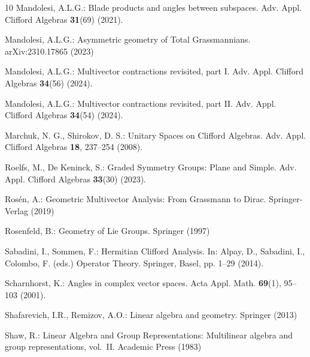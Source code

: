 \documentclass{birkjour}
\theoremstyle{definition}
\begin{document}
\begin{thebibliography}{10}
	Mandolesi, A.L.G.: Blade products and angles between subspaces.
	\newblock Adv. Appl. Clifford Algebras \textbf{31}(69) (2021).
	\newblock {}
	
	Mandolesi, A.L.G.: Asymmetric geometry of {T}otal {G}rassmannians.
	\newblock arXiv:2310.17865  (2023)
	
	Mandolesi, A.L.G.: Multivector contractions revisited, part {I}.
	\newblock Adv. Appl. Clifford Algebras \textbf{34}(56) (2024).
	\newblock {}
	
	Mandolesi, A.L.G.: Multivector contractions revisited, part {II}.
	\newblock Adv. Appl. Clifford Algebras \textbf{34}(54) (2024).
	\newblock {}
	
	Marchuk, N. G., Shirokov, D. S.: Unitary Spaces on {C}lifford Algebras.
	\newblock Adv. Appl. Clifford Algebras \textbf{18}, 237--254 (2008).
	\newblock {}
	
	Roelfs, M., De Keninck, S.: Graded Symmetry Groups: Plane and Simple.
	\newblock Adv. Appl. Clifford Algebras \textbf{33}(30) (2023).
	\newblock {}
	
	Ros{\'e}n, A.: Geometric Multivector Analysis: From Grassmann to Dirac.
	\newblock Springer-Verlag (2019)
	
	Rosenfeld, B.: Geometry of {L}ie Groups.
	\newblock Springer (1997)
	
	Sabadini, I., Sommen, F.: Hermitian Clifford Analysis.
	\newblock In: Alpay, D., Sabadini, I., Colombo, F. (eds.) Operator Theory. Springer, Basel, pp. 1--29 (2014).
	
	Scharnhorst, K.: Angles in complex vector spaces.
	\newblock Acta Appl. Math. \textbf{69}(1), 95--103 (2001).
	\newblock {}
	
	Shafarevich, I.R., Remizov, A.O.: Linear algebra and geometry.
	\newblock Springer (2013)
	
	Shaw, R.: Linear Algebra and Group Representations: Multilinear algebra and
	group representations, vol.~II.
	\newblock Academic Press (1983)
	

\end{thebibliography}
\end{document}
